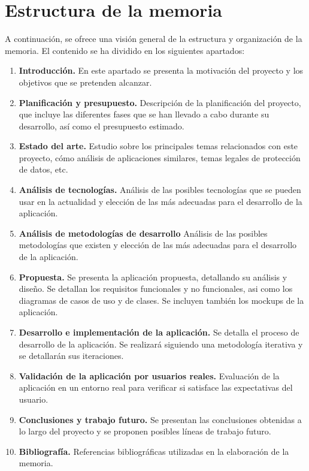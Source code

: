 \section{Estructura de la memoria}
\label{sec:estructura}

A continuación, se ofrece una visión general de la estructura y organización de la memoria. El contenido se ha dividido en los siguientes apartados:

\begin{enumerate}
	\item \textbf{Introducción.} En este apartado se presenta la motivación del proyecto y los objetivos que se pretenden alcanzar.
	\item \textbf{Planificación y presupuesto.} Descripción de la planificación del proyecto, que incluye las diferentes fases que se han llevado a cabo durante su desarrollo, así como el presupuesto estimado. 
	\item \textbf{Estado del arte.} Estudio sobre los principales temas relacionados con este proyecto, cómo análisis de aplicaciones similares, temas legales de protección de datos, etc.
	\item \textbf{Análisis de tecnologías.} Análisis de las posibles tecnologías que se pueden usar en la actualidad y elección de las más adecuadas para el desarrollo de la aplicación.
	\item \textbf{Análisis de metodologías de desarrollo} Análisis de las posibles metodologías que existen y elección de las más adecuadas para el desarrollo de la aplicación.
	\item \textbf{Propuesta.} Se presenta la aplicación propuesta, detallando su análisis y diseño. Se detallan los requisitos funcionales y no funcionales, asi como los diagramas de casos de uso y de clases. Se incluyen también los mockups de la aplicación.
	\item \textbf{Desarrollo e implementación de la aplicación.} Se detalla el proceso de desarrollo de la aplicación. Se realizará siguiendo una metodología iterativa y se detallarán sus iteraciones.
	\item \textbf{Validación de la aplicación por usuarios reales.} Evaluación de la aplicación en un entorno real para verificar si satisface las expectativas del usuario.
	\item \textbf{Conclusiones y trabajo futuro.} Se presentan las conclusiones obtenidas a lo largo del proyecto y se proponen posibles líneas de trabajo futuro.
	\item \textbf{Bibliografía.} Referencias bibliográficas utilizadas en la elaboración de la memoria.

\end{enumerate}


\newpage